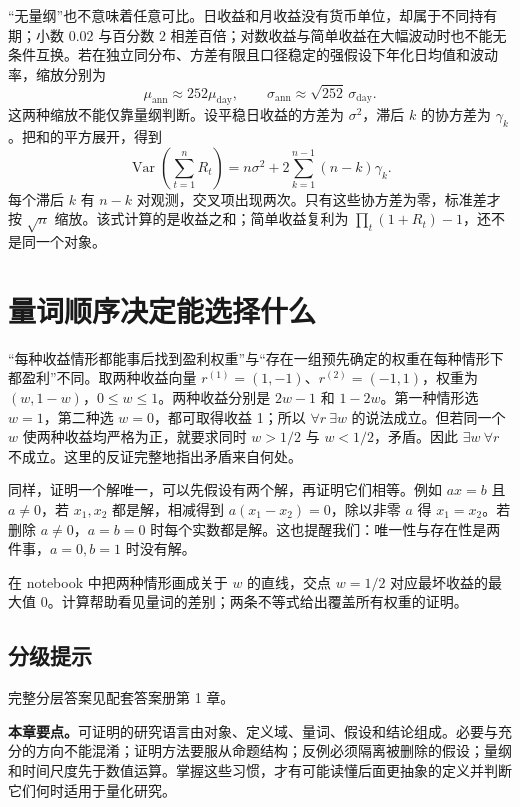 “无量纲”也不意味着任意可比。日收益和月收益没有货币单位，却属于不同持有期；小数 $0.02$ 与百分数 $2$ 相差百倍；对数收益与简单收益在大幅波动时也不能无条件互换。若在独立同分布、方差有限且口径稳定的强假设下年化日均值和波动率，缩放分别为
\[
  \mu_{\mathrm{ann}}\approx252\mu_{\mathrm{day}},\qquad
  \sigma_{\mathrm{ann}}\approx\sqrt{252}\,\sigma_{\mathrm{day}}.
\]
这两种缩放不能仅靠量纲判断。设平稳日收益的方差为 $\sigma^2$，滞后 $k$ 的协方差为 $\gamma_k$。把和的平方展开，得到
\[
 \operatorname{Var}\!\left(\sum_{t=1}^nR_t\right)
 =n\sigma^2+2\sum_{k=1}^{n-1}(n-k)\gamma_k.
\]
每个滞后 $k$ 有 $n-k$ 对观测，交叉项出现两次。只有这些协方差为零，标准差才按 $\sqrt n$ 缩放。该式计算的是收益之和；简单收益复利为 $\prod_t(1+R_t)-1$，还不是同一个对象。

\section{量词顺序决定能选择什么}
“每种收益情形都能事后找到盈利权重”与“存在一组预先确定的权重在每种情形下都盈利”不同。取两种收益向量 $r^{(1)}=(1,-1)$、$r^{(2)}=(-1,1)$，权重为 $(w,1-w)$，$0\leq w\leq1$。两种收益分别是 $2w-1$ 和 $1-2w$。第一种情形选 $w=1$，第二种选 $w=0$，都可取得收益 1；所以 $\forall r\ \exists w$ 的说法成立。但若同一个 $w$ 使两种收益均严格为正，就要求同时 $w>1/2$ 与 $w<1/2$，矛盾。因此 $\exists w\ \forall r$ 不成立。这里的反证完整地指出矛盾来自何处。

同样，证明一个解唯一，可以先假设有两个解，再证明它们相等。例如 $ax=b$ 且 $a\ne0$，若 $x_1,x_2$ 都是解，相减得到 $a(x_1-x_2)=0$，除以非零 $a$ 得 $x_1=x_2$。若删除 $a\ne0$，$a=b=0$ 时每个实数都是解。这也提醒我们：唯一性与存在性是两件事，$a=0,b=1$ 时没有解。

在 notebook 中把两种情形画成关于 $w$ 的直线，交点 $w=1/2$ 对应最坏收益的最大值 0。计算帮助看见量词的差别；两条不等式给出覆盖所有权重的证明。



\subsection*{分级提示}


完整分层答案见配套答案册第 1 章。

\noindent\textbf{本章要点。}可证明的研究语言由对象、定义域、量词、假设和结论组成。必要与充分的方向不能混淆；证明方法要服从命题结构；反例必须隔离被删除的假设；量纲和时间尺度先于数值运算。掌握这些习惯，才有可能读懂后面更抽象的定义并判断它们何时适用于量化研究。
